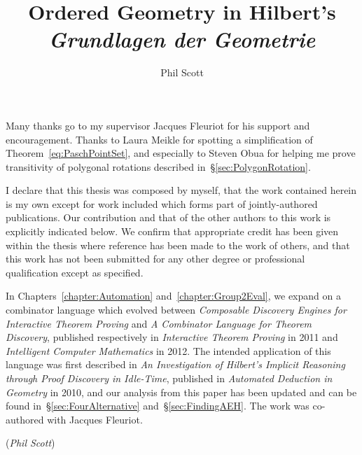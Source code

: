 \documentclass[phd,cisa]{infthesis}
\title{Ordered Geometry in Hilbert's \emph{Grundlagen der Geometrie}}
\author{Phil Scott}
\begin{document}
\begin{preliminary}

\maketitle

\begin{acknowledgements}
Many thanks go to my supervisor Jacques Fleuriot for his support and encouragement. Thanks to Laura Meikle for spotting a simplification of Theorem~\ref{eq:PaschPointSet}, and especially to Steven Obua for helping me prove transitivity of polygonal rotations described in~\S\ref{sec:PolygonRotation}.
\end{acknowledgements}

\begin{declaration}
  I declare that this thesis was composed by myself, that the work contained herein is my own except for work included which forms part of jointly-authored publications. Our contribution and that of the other authors to this work is explicitly indicated below. We confirm that appropriate credit has been given within the thesis where reference has been made to the work of others, and that this work has not been submitted for any other degree or professional qualification except as specified.

In Chapters~\ref{chapter:Automation} and~\ref{chapter:Group2Eval}, we expand on a combinator language which evolved between \emph{Composable Discovery Engines for Interactive Theorem Proving} and \emph{A Combinator Language for Theorem Discovery}, published respectively in \emph{Interactive Theorem Proving} in 2011 and \emph{Intelligent Computer Mathematics} in 2012. The intended application of this language was first described in \emph{An Investigation of Hilbert's Implicit Reasoning through Proof
Discovery in Idle-Time}, published in {\em Automated Deduction in Geometry} in 2010, and our analysis from this paper has been updated and can be found in~\S\ref{sec:FourAlternative} and~\S\ref{sec:FindingAEH}. The work was co-authored with Jacques Fleuriot.
   \par
   \vspace{1in}\raggedleft({\em Phil Scott})
 \end{declaration}

\tableofcontents

\end{preliminary}
\end{document}

